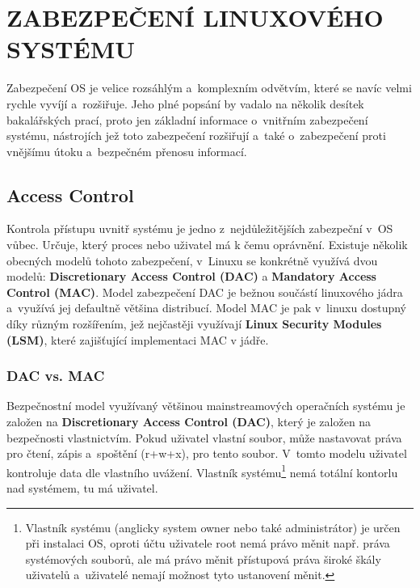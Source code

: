 \documentclass[a4paper,12pt]{article}
\newcommand{\upc}[1]{\uppercase{#1}} %
\renewcommand{\b}[1]{\textbf{#1}} %
\begin{document}
\section{\upc{Zabezpečení Linuxového systému}}
Zabezpečení OS je velice rozsáhlým a~komplexním odvětvím, které se navíc velmi rychle vyvíjí a~rozšiřuje. Jeho plné popsání by vadalo na několik desítek bakalářských prací, proto jen základní informace o~vnitřním zabezpečení systému, nástrojích jež toto zabezpečení rozšiřují a~také o~zabezpečení proti vnějšímu útoku a~bezpečném přenosu informací.
\subsection{Access Control}
Kontrola přístupu uvnitř systému je jedno z~nejdůležitějších zabezpeční v~OS vůbec. Určuje, který proces nebo uživatel má k čemu oprávnění. Existuje několik obecných modelů tohoto zabezpečení, v~Linuxu se konkrétně využívá dvou modelů: \b{Discretionary Access Control (DAC)} a \b{Mandatory Access Control (MAC)}. Model zabezpečení DAC je bežnou součástí linuxového jádra a~využívá jej defaultně většina distribucí. Model MAC je pak v~linuxu dostupný díky různým rozšířením, jež nejčastěji využívají \b{Linux Security Modules (LSM)}, které zajišťující implementaci MAC v jádře.
\subsubsection{DAC vs. MAC}
Bezpečnostní model využívaný většinou mainstreamových operačních systému je založen na \b{Discretionary Access Control (DAC)}, který je založen na bezpečnosti vlastnictvím. Pokud uživatel vlastní soubor, může nastavovat práva pro čtení, zápis a~spoštění (r+w+x), pro tento soubor. V~tomto modelu uživatel kontroluje data dle vlastního uvážení. Vlastník systému\footnote{Vlastník systému (anglicky system owner nebo také administrátor) je určen při instalaci OS, oproti účtu uživatele root nemá právo měnit např. práva systémových souborů, ale má právo měnit přístupová práva široké škály uživatelů a~uživatelé nemají možnost tyto ustanovení měnit.\cite{SystemOwner}}
 nemá totální kontorlu nad systémem, tu má uživatel.~\cite{Linux_com_MACvsDAC}
\end{document}
